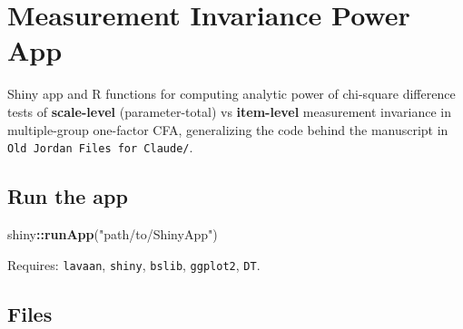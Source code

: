 \documentclass[
]{article}
\author{}
\date{\vspace{-2.5em}}
\newenvironment{Shaded}{\begin{snugshade}}{\end{snugshade}}
\newcommand{\FunctionTok}[1]{\textcolor[rgb]{0.13,0.29,0.53}{\textbf{#1}}}
\newcommand{\NormalTok}[1]{#1}
\newcommand{\SpecialCharTok}[1]{\textcolor[rgb]{0.81,0.36,0.00}{\textbf{#1}}}
\newcommand{\StringTok}[1]{\textcolor[rgb]{0.31,0.60,0.02}{#1}}
\begin{document}
\section{Measurement Invariance Power
App}\label{measurement-invariance-power-app}

Shiny app and R functions for computing analytic power of chi-square
difference tests of \textbf{scale-level} (parameter-total) vs
\textbf{item-level} measurement invariance in multiple-group one-factor
CFA, generalizing the code behind the manuscript in
\texttt{Old\ Jordan\ Files\ for\ Claude/}.

\subsection{Run the app}\label{run-the-app}

\begin{Shaded}
\begin{Highlighting}[]
\NormalTok{shiny}\SpecialCharTok{::}\FunctionTok{runApp}\NormalTok{(}\StringTok{"path/to/ShinyApp"}\NormalTok{)}
\end{Highlighting}
\end{Shaded}

Requires: \texttt{lavaan}, \texttt{shiny}, \texttt{bslib},
\texttt{ggplot2}, \texttt{DT}.

\subsection{Files}\label{files}
\end{document}
